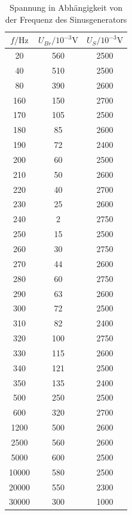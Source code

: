 \documentclass[
  bibliography=totoc,     %
  captions=tableheading,  %
  titlepage=firstiscover, %
]{scrartcl}
\begin{document}
  \begin{table}
    \centering
    \caption{Spannung in Abhängigkeit von der Frequenz des Sinusgenerators}
    \label{tab:Wien-Robinson}
    \begin{tabular}{c c c}
      \toprule
      $f/\unit{\hertz}$ & $ U_{Br}/10^{-3}\unit{\volt}$ & $U_{S}/10^{-3}\unit{\volt}$ \\
      \midrule
      20   &    560 &    2500\\
      40    &   510  &   2500\\
      80     &  390  &   2600\\
     160      & 150   &  2700\\
     170       &105    & 2500\\
     180        &85     &2600\\
     190        &72     &2400\\
     200        &60     &2500\\
     210        &50     &2600\\
     220        &40     &2700\\
     230        &25     &2600\\
     240         &2     &2750\\
     250        &15     &2500\\
     260        &30     &2750\\
     270        &44     &2600\\
     280        &60     &2750\\
     290        &63     &2600\\
     300        &72     &2500\\
     310        &82     &2400\\
     320       &100     &2750\\
     330       &115     &2600\\
     340       &121     &2500\\
     350       &135     &2400\\
     500       &250     &2500\\
     600       &320     &2700\\
    1200       &500     &2600\\
    2500       &560     &2600\\
    5000       &600     &2500\\
   10000       &580     &2500\\
   20000       &550     &2300\\
   30000       &300     &1000\\

      \bottomrule
    \end{tabular}
  \end{table}
  \FloatBarrier
\end{document}
